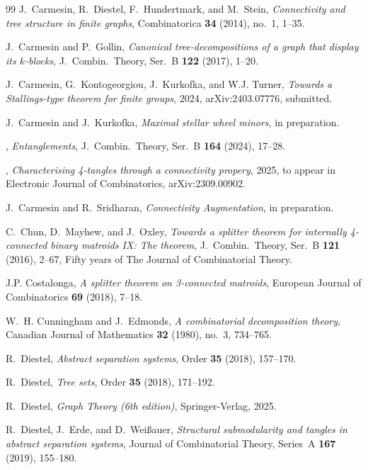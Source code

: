 \documentclass{aic}
\theoremstyle{plain}
\theoremstyle{definition}
\theoremstyle{plain}
\theoremstyle{plain}
\begin{document}
\begin{thebibliography}{99}
J.~Carmesin, R.~Diestel, F.~Hundertmark, and M.~Stein, \emph{Connectivity and
  tree structure in finite graphs}, Combinatorica \textbf{34} (2014), no.~1,
  1--35.

J.~Carmesin and P.~Gollin, \emph{Canonical tree-decompositions of a graph that
  display its $k$-blocks}, J.~Combin.\ Theory, Ser.~B \textbf{122} (2017),
  1--20.

J.~Carmesin, G.~Kontogeorgiou, J.~Kurkofka, and W.J. Turner, \emph{Towards a
  {S}tallings-type theorem for finite groups}, 2024, arXiv:2403.07776,
  submitted.

J.~Carmesin and J.~Kurkofka, \emph{Maximal stellar wheel minors}, in
  preparation.

\bysame, \emph{Entanglements}, J.~Combin.\ Theory, Ser.~B \textbf{164} (2024),
  17--28.

\bysame, \emph{Characterising 4-tangles through a connectivity propery}, 2025,
  to appear in Electronic Journal of Combinatorics, arXiv:2309.00902.

J.~Carmesin and R.~Sridharan, \emph{Connectivity {A}ugmentation}, in
  preparation.

C.~Chun, D.~Mayhew, and J.~Oxley, \emph{Towards a splitter theorem for
  internally 4-connected binary matroids {IX}: {T}he theorem}, J.~Combin.\
  Theory, Ser.~B \textbf{121} (2016), 2--67, Fifty years of The Journal of
  Combinatorial Theory.

J.P. Costalonga, \emph{A splitter theorem on 3-connected matroids}, European
  Journal of Combinatorics \textbf{69} (2018), 7--18.

W.~H. Cunningham and J.~Edmonds, \emph{A combinatorial decomposition theory},
  Canadian Journal of Mathematics \textbf{32} (1980), no.~3, 734--765.

R.~Diestel, \emph{Abstract separation systems}, Order \textbf{35} (2018),
  157--170.

R.~Diestel, \emph{Tree sets}, Order \textbf{35} (2018), 171--192.

R.~Diestel, \emph{Graph {T}heory \emph{(6th edition)}}, Springer-Verlag, 2025.

R.~Diestel, J.~Erde, and D.~Weißauer, \emph{Structural submodularity and
  tangles in abstract separation systems}, Journal of Combinatorial Theory,
  Series~A \textbf{167} (2019), 155--180.


\end{thebibliography}
\end{document}
